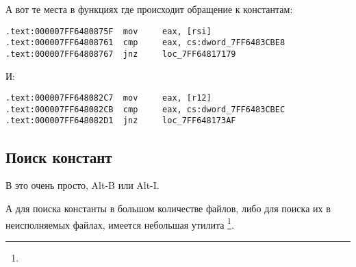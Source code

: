 А вот те места в функциях где происходит обращение к константам:

\begin{lstlisting}[caption=dhcpcore.dll (Windows 7 x64)]
.text:000007FF6480875F  mov     eax, [rsi]
.text:000007FF64808761  cmp     eax, cs:dword_7FF6483CBE8
.text:000007FF64808767  jnz     loc_7FF64817179
\end{lstlisting}

И:

\begin{lstlisting}[caption=dhcpcore.dll (Windows 7 x64)]
.text:000007FF648082C7  mov     eax, [r12]
.text:000007FF648082CB  cmp     eax, cs:dword_7FF6483CBEC
.text:000007FF648082D1  jnz     loc_7FF648173AF
\end{lstlisting}

\subsection{Поиск констант}

В \IDA это очень просто, Alt-B или Alt-I.

А для поиска константы в большом количестве файлов, либо для поиска их в неисполняемых файлах, имеется небольшая утилита
\footnote{\BGREPURL}.

